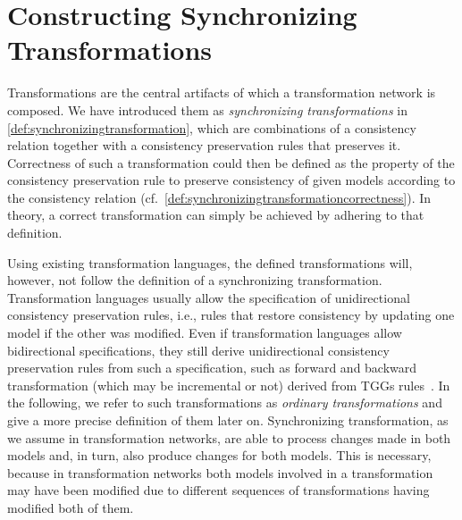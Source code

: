 \chapter{Constructing Synchronizing Transformations
}
\label{chap:synchronization}



Transformations are the central artifacts of which a transformation network is composed.
We have introduced them as \emph{synchronizing transformations} in \autoref{def:synchronizingtransformation}, which are combinations of a consistency relation together with a consistency preservation rules that preserves it.
Correctness of such a transformation could then be defined as the property of the consistency preservation rule to preserve consistency of given models according to the consistency relation (cf.\ \autoref{def:synchronizingtransformationcorrectness}).
In theory, a correct transformation can simply be achieved by adhering to that definition.

Using existing transformation languages, the defined transformations will, however, not follow the definition of a synchronizing transformation.
Transformation languages usually allow the specification of unidirectional consistency preservation rules, i.e., rules that restore consistency by updating one model if the other was modified.
Even if transformation languages allow bidirectional specifications, they still derive unidirectional consistency preservation rules from such a specification, such as forward and backward transformation (which may be incremental or not) derived from \glspl{TGG} rules~\cite{leblebici2014IncrementalTGGSurvey-GTVMT}.
In the following, we refer to such transformations as \emph{ordinary transformations} and give a more precise definition of them later on.
Synchronizing transformation, as we assume in transformation networks, are able to process changes made in both models and, in turn, also produce changes for both models.
This is necessary, because in transformation networks both models involved in a transformation may have been modified due to different sequences of transformations having modified both of them.

